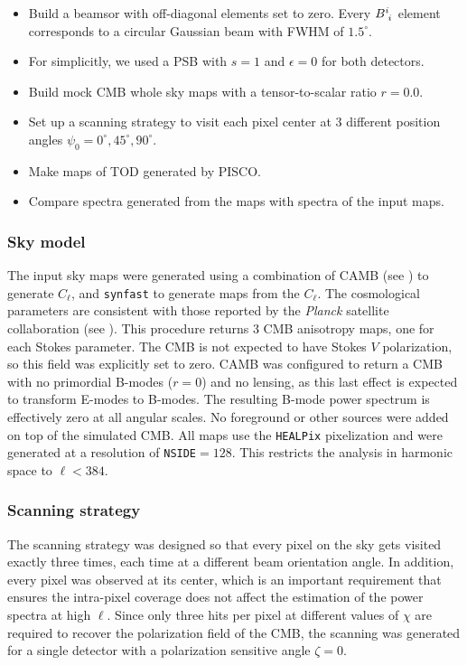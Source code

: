 \documentclass[a4paper,11pt]{article}
\begin{document}
\begin{itemize}
    \item Build a beamsor with off-diagonal elements set to zero. Every $\tensor{B}{^i_i}$ element corresponds to a circular Gaussian beam with FWHM of $1.5^\circ$. 
    \item For simplicitly, we used a PSB with $s=1$ and $\epsilon=0$ for both detectors.
    \item Build mock CMB whole sky maps with a tensor-to-scalar ratio $r=0.0$.
	\item Set up a scanning strategy to visit each pixel center at 3 different position angles $\psi_0 = 0^{\circ},45^{\circ},90^{\circ}$. 
	\item Make maps of TOD generated by PISCO. 
	\item Compare spectra generated from the maps with spectra of the input maps.
\end{itemize}

\subsubsection{Sky model}
\label{subsec::sky_model}

The input sky maps were generated using a combination of CAMB (see \cite{Lewis:2002ah}) to generate $C_\ell$, and \texttt{synfast} to generate maps from the $C_\ell$. The cosmological parameters are consistent with those reported by the \textsl{Planck} satellite collaboration (see \cite{2016A&A...594A..13P}). This procedure returns 3 CMB anisotropy maps, one for each Stokes parameter. The CMB is not expected to have Stokes $V$ polarization, so this field was explicitly set to zero. CAMB was configured to return a CMB with no primordial B-modes ($r=0$) and no lensing, as this last effect is expected to transform E-modes to B-modes. The resulting B-mode power spectrum is effectively zero at all angular scales. No foreground or other sources were added on top of the simulated CMB. All maps use the \texttt{HEALPix} pixelization and were generated at a resolution of \texttt{NSIDE}$=128$. This restricts the analysis in harmonic space to $\ell < 384$.

\subsubsection{Scanning strategy}

The scanning strategy was designed so that every pixel on the sky gets visited exactly three times, each time at a different beam orientation angle. In addition, every pixel was observed at its center, which is an important requirement that ensures the intra-pixel coverage does not affect the estimation of the power spectra at high $\ell$. Since only three hits per pixel at different values of $\chi$ are required to recover the polarization field of the CMB, the scanning was generated for a single detector with a polarization sensitive angle $\zeta=0$.
\end{document}
